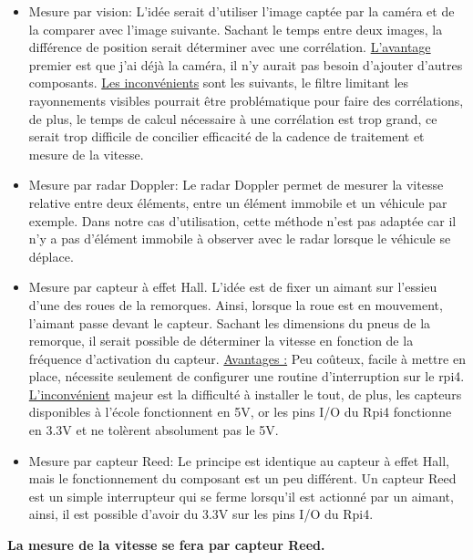 \begin{itemize}
    \item Mesure par vision: L'idée serait d'utiliser l'image captée par la caméra et de la comparer avec l'image suivante. Sachant le temps entre deux images,
          la différence de position serait déterminer avec une corrélation. \underline{L'avantage} premier est que j'ai déjà la caméra, il n'y aurait pas besoin d'ajouter d'autres composants.
          \underline{Les inconvénients} sont les suivants, le filtre limitant les rayonnements visibles pourrait être problématique pour faire des corrélations, de plus, le temps de calcul nécessaire
          à une corrélation est trop grand, ce serait trop difficile de concilier efficacité de la cadence de traitement et mesure de la vitesse.
    \item Mesure par radar Doppler: Le radar Doppler permet de mesurer la vitesse relative entre deux éléments, entre un élément immobile et un véhicule par exemple. Dans notre cas d'utilisation, cette méthode n'est pas adaptée car il n'y
          a pas d'élément immobile à observer avec le radar lorsque le véhicule se déplace.
    \item Mesure par capteur à effet Hall. L'idée est de fixer un aimant sur l'essieu d'une des roues de la remorques.
          Ainsi, lorsque la roue est en mouvement, l'aimant passe devant le capteur. Sachant les dimensions du pneus de la remorque, il serait possible de déterminer la vitesse en fonction de la fréquence d'activation du capteur.
          \underline{Avantages :} Peu coûteux, facile à mettre en place, nécessite seulement de configurer une routine d'interruption sur le \Gls{rpi4}.
          \underline{L'inconvénient} majeur est la difficulté à installer le tout, de plus, les capteurs disponibles à l'école fonctionnent en 5V, or les pins I/O du Rpi4 fonctionne en 3.3V et ne tolèrent absolument pas le 5V.
    \item Mesure par capteur Reed: Le principe est identique au capteur à effet Hall, mais le fonctionnement du composant est un peu différent. Un capteur Reed est un simple interrupteur qui se ferme lorsqu'il est actionné par un aimant,
          ainsi, il est possible d'avoir du 3.3V sur les pins I/O du Rpi4.
\end{itemize}
\textbf{La mesure de la vitesse se fera par capteur Reed.}
